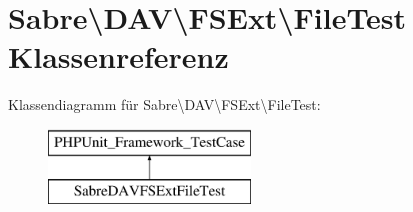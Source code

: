 \hypertarget{class_sabre_1_1_d_a_v_1_1_f_s_ext_1_1_file_test}{}\section{Sabre\textbackslash{}D\+AV\textbackslash{}F\+S\+Ext\textbackslash{}File\+Test Klassenreferenz}
\label{class_sabre_1_1_d_a_v_1_1_f_s_ext_1_1_file_test}
Klassendiagramm für Sabre\textbackslash{}D\+AV\textbackslash{}F\+S\+Ext\textbackslash{}File\+Test\+:\begin{figure}[H]
\begin{center}
\leavevmode
\includegraphics[height=2.000000cm]{class_sabre_1_1_d_a_v_1_1_f_s_ext_1_1_file_test}
\end{center}
\end{figure}
